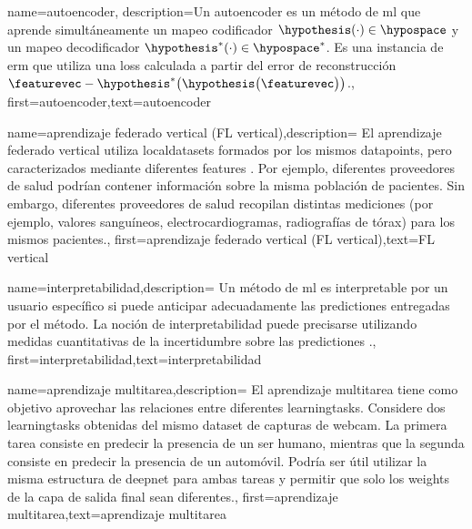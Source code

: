 {name={autoencoder},
	description={Un autoencoder es un método de \gls{ml} que aprende simultáneamente un mapeo codificador
		$\hypothesis(\cdot) \in \hypospace$ y un mapeo decodificador $\hypothesis^{*}(\cdot) \in \hypospace^{*}$. 
		Es una instancia de \gls{erm} que utiliza una \gls{loss} calculada a partir del error de reconstrucción 
		$\featurevec - \hypothesis^{*}\big(  \hypothesis \big( \featurevec \big) \big)$.},
	first={autoencoder},text={autoencoder}
} 

{name={aprendizaje federado vertical (FL vertical)},description=
	{El aprendizaje federado vertical utiliza \gls{localdataset}s
	 formados por los mismos \gls{datapoint}s, pero caracterizados mediante diferentes \gls{feature}s \cite{VFLChapter}. 
     Por ejemplo, diferentes proveedores de salud podrían contener información
	 sobre la misma población de pacientes. Sin embargo, diferentes proveedores de salud
	 recopilan distintas mediciones (por ejemplo, valores sanguíneos, electrocardiogramas, radiografías de tórax)
	 para los mismos pacientes.},
	first={aprendizaje federado vertical (FL vertical)},text={FL vertical}
} 

{name={interpretabilidad},description=
		{Un método de \gls{ml} es interpretable  por un usuario específico si
		puede anticipar adecuadamente las \gls{prediction}es entregadas por el método. 
		La noción de interpretabilidad puede precisarse utilizando medidas cuantitativas
		de la incertidumbre sobre las \gls{prediction}es \cite{JunXML2020}.},
		first={interpretabilidad},text={interpretabilidad}
}

{name={aprendizaje multitarea},description=
	{El aprendizaje multitarea tiene como objetivo aprovechar las relaciones entre diferentes \gls{learningtask}s. 
	Considere dos \gls{learningtask}s obtenidas del mismo \gls{dataset} de capturas de webcam.
	La primera tarea consiste en predecir la presencia de un ser humano, 
	mientras que la segunda consiste en predecir la presencia de un automóvil. Podría ser útil utilizar la misma estructura de \gls{deepnet} para ambas tareas y permitir que solo los \gls{weights} 
	de la capa de salida final sean diferentes.},
	first={aprendizaje multitarea},text={aprendizaje multitarea}
}

